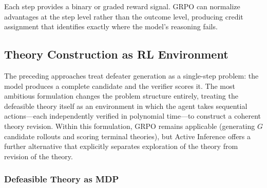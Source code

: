 \documentclass{article}
\begin{document}
Each step provides a binary or graded reward signal. GRPO can normalize advantages at the step level rather than the outcome level, producing credit assignment that identifies exactly where the model's reasoning fails.

\subsection{Theory Construction as RL Environment}

The preceding approaches treat defeater generation as a single-step problem: the model produces a complete candidate and the verifier scores it. The most ambitious formulation changes the problem structure entirely, treating the defeasible theory itself as an environment in which the agent takes sequential actions---each independently verified in polynomial time---to construct a coherent theory revision. Within this formulation, GRPO remains applicable (generating $G$ candidate rollouts and scoring terminal theories), but Active Inference offers a further alternative that explicitly separates exploration of the theory from revision of the theory.

\subsubsection{Defeasible Theory as MDP}
\end{document}
